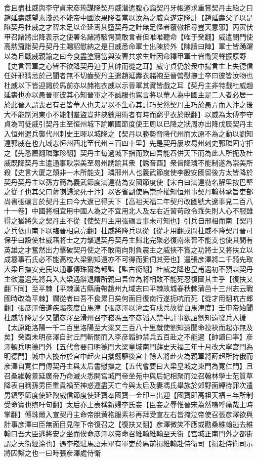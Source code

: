 食且盡杜威與李守貞宋彦筠謀降契丹威潜遣腹心詣契丹牙帳邀求重賞契丹主紿之曰趙延夀威望素淺恐不能帝中國汝果降者當以汝為之威喜遂定降計【趙延夀父子以是陷契丹杜威之才智未足以企延夀其墮契丹之計無足怪者覆轍相尋豈天意邪】丙寅伏甲召諸將出降表示之使署名諸將駭愕莫敢言者但唯唯聽命【唯于癸翻】威遣閤門使高勲齎詣契丹契丹主賜詔慰納之是日威悉命軍士出陳於外【陳讀曰陣】軍士皆踴躍以為且戰威親諭之曰今食盡塗窮當與汝曹共求生計因命釋甲軍士皆慟哭聲振原野【史言晉軍之心皆不欲降契丹迫于其帥而從之耳】威守貞仍於衆中揚言主上失德信任奸邪猜忌於己聞者無不切齒契丹主遣趙延夀衣赭袍至晉營慰撫士卒曰彼皆汝物也杜威以下皆迎謁於馬前亦以赭袍衣威以示晉軍其實皆戲之耳【契丹主非特戲杜威趙延夀也亦以愚晉軍彼其心知晉軍之不誠服也駕言將以華人為中國主是二人者必居一於此晉人謂喪君有君皆華人也夫是以不生心其計巧矣然契丹主巧於愚弄而入汴之後大不能制河東小不能制羣盜豈非挾數用術者有時而窮乎衣於既翻】以威為太傅李守貞為司徒威引契丹主至恒州城下諭順國節度使王周以已降之狀周亦出降戊辰契丹主入恒州遣兵襲代州刺史王暉以城降之【契丹以勝勢脅降代州而太原不為之動以劉知遠郭威在也九域志恒州西北至代州三百四十里】先是契丹屢攻易州刺史郭璘固守拒之【先悉薦翻璘離珍翻】契丹主每過城下指而歎曰吾能吞併天下而為此人所扼及杜威既降契丹主遣通事耿崇美至易州誘諭其衆【誘音酉】衆皆降璘不能制遂為崇美所殺【史言大厦之顛非一木所能支】璘邢州人也義武節度使李殷安國留後方太皆降於契丹契丹主以孫方簡為義武節度滿達勒為安國節度使【宋白曰滿達勒名解里按巴堅之從子也其父曰薩喇歸梁死于汴】以客省副使馬崇祚權知恒州事契丹翰林承旨吏部尚書張礪言於契丹主曰今大遼已得天下【高祖天福二年契丹改國號大遼事見二百八十一卷】中國將相宜用中國人為之不宜用北人及左右近習苟政令乖失則人心不服雖得之猶將失之契丹主不從【使契丹主用張礪言事未可知也】引兵自邢相而南【契丹之兵依山南下以臨晉相息亮翻】杜威將降兵以從【從才用翻或問杜威不降契丹晉可保乎曰設使杜威藉將士之力擊退契丹契丹主歸北完聚必復南來晉不能支也使其間有英雄之才奮然出力擊破契丹使之不敢南向則負震主之威挾不賞之功將士又將扶立以成簒事石氏必不能高枕大梁劉知遠亦不可得而狙伺其旁也】遣張彦澤將二千騎先取大梁且撫安吏民以通事傅珠爾為都監【監古銜翻】杜威之降也皇甫遇初不預謀契丹主欲遣遇先將兵入大梁遇辭退謂所親曰吾位為將相敗不能死忍復圖其主乎【復扶又翻下同】至平棘【平棘漢古縣唐帶趙州九域志曰平棘故城春秋棘蒲邑十三州志云戰國時改為平棘】謂從者曰吾不食累日矣何面目復南行遂扼吭而死【從才用翻吭古郎翻】張彦澤倍道疾驅夜度白馬津【張彦澤以澶孟有戍兵故從白馬津度】壬申帝始聞杜威等降是夕又聞彦澤至滑州召李崧馮玉李彦韜入禁中計事欲詔劉知遠發兵入援【太原距洛陽一千二百里洛陽至大梁又三百八十里就使劉知遠聞命投袂而起亦無及矣】癸酉未明彦澤自封丘門斬關而入李彦韜帥禁兵五百赴之不能遏【帥讀曰率】彦澤頓兵明德門外【五代會要曰明德門大梁皇城南門薛史天福三年十月改大寧宫門為明德門】城中大擾帝於宫中起火自攜劒驅後宫十餘人將赴火為親軍將薛超所持俄而彦澤自寛仁門傳契丹主與太后書慰撫之【五代會要曰大梁皇城之東門為寛仁門】且召桑維翰景延廣帝乃命滅火悉開宫城門帝坐苑中與后妃相聚而泣召翰林學士范質草降表自稱孫男臣重貴禍至神惑運盡天亡今與太后及妻馮氏舉族於郊野面縛待罪次遣男鎮寧節度使延煦威信節度使延寶奉國寶一金印三出迎【國寶即高祖天福三年所制受命寶也煦吁句翻】太后亦上表稱新婦李氏妾【臣妾之辱惟晉宋為然嗚呼痛哉上時掌翻】傅珠爾入宣契丹主命帝脫黄袍服素衫再拜受宣左右皆掩泣帝使召張彦澤欲與計事彦澤曰臣無面目見陛下帝復召之【復扶又翻】彦澤微笑不應或勸桑維翰逃去維翰曰吾大臣逃將安之坐而俟命彦澤以帝命召維翰維翰至天街【宫城正南門外之都街謂之天街經涂也】遇李崧駐馬語未畢有軍吏於馬前揖維翰赴侍衛司【揖赴侍衛司示將囚繫之也一曰時張彦澤處侍衛